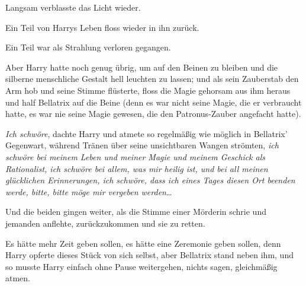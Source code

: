 Langsam verblasste das Licht wieder.

Ein Teil von Harrys Leben floss wieder in ihn zurück.

Ein Teil war als Strahlung verloren gegangen.

Aber Harry hatte noch genug übrig, um auf den Beinen zu bleiben und die silberne menschliche Gestalt hell leuchten zu lassen; und als sein Zauberstab den Arm hob und seine Stimme  flüsterte, floss die Magie gehorsam aus ihm heraus und half Bellatrix auf die Beine (denn es war nicht seine Magie, die er verbraucht hatte, es war nie seine Magie gewesen, die den Patronus-Zauber angefacht hatte).

\emph{Ich schwöre}, dachte Harry und atmete so regelmäßig wie möglich in Bellatrix’ Gegenwart, während Tränen über seine unsichtbaren Wangen strömten, \emph{ich schwöre bei meinem Leben und meiner Magie und meinem Geschick als Rationalist, ich schwöre bei allem, was mir heilig ist, und bei all meinen glücklichen Erinnerungen, ich schwöre, dass ich eines Tages diesen Ort beenden werde, bitte, bitte möge mir vergeben werden}…

Und die beiden gingen weiter, als die Stimme einer Mörderin schrie und jemanden anflehte, zurückzukommen und sie zu retten.

Es hätte mehr Zeit geben sollen, es hätte eine Zeremonie geben sollen, denn Harry opferte dieses Stück von sich selbst, aber Bellatrix stand neben ihm, und so musste Harry einfach ohne Pause weitergehen, nichts sagen, gleichmäßig atmen.

